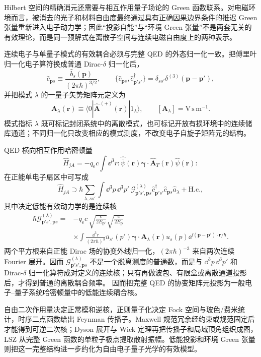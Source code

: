 Hilbert 空间的精确消元还需要与相互作用量子场论的 Green 函数联系。对电磁环境而言，被消去的光子和材料自由度最终通过具有正确因果边界条件的推迟 Green 张量重新进入电子动力学；因此“投影自能”与“环境 Green 张量”不是两套无关的有效理论，而是同一预解式在离散子空间与连续电磁自由度上的两种表示。



连续电子与单量子模式的有效耦合必须与完整 QED 的外态归一化一致。把傅里叶归一化电子算符换成普通 Dirac-$\delta$ 归一化后，
\[
 \hat c_{\mathbf p s}
 \equiv\frac{\hat b_s(\mathbf p)}{(2\pi\hbar)^{3/2}},
 \qquad
 \{\hat c_{\mathbf p s},\hat c_{\mathbf p's'}^\dagger\}
 =\delta_{ss'}\delta^{(3)}(\mathbf p-\mathbf p'),
\]
并把模式 $\lambda$ 的一量子矢势矩阵元定义为
\[
 \mathbf A_\lambda(\mathbf r)
 \equiv
 \langle0|\hat{\mathbf A}^{(+)}(\mathbf r)|1_\lambda\rangle,
 \qquad
 [\mathbf A_\lambda]=\mathrm{V\,s\,m^{-1}}.
\]
模式指标 $\lambda$ 既可标记封闭系统中的离散模式，也可标记开放有损环境中的连续储库通道；不同归一化只改变相应的模式测度，不改变电子自旋子矩阵元的结构。

QED 横向相互作用哈密顿量
\[
 \hat H_{jA}
 =-q_{\mathrm e} c\int\dd^3 r:\!\hat{\bar\psi}(\mathbf r)
 \boldsymbol\gamma\cdot\hat{\mathbf A}_T(\mathbf r)
 \hat\psi(\mathbf r)\!:
\]
在正能单电子扇区中可写成
\[
 \hat H_{jA}
 \supset
 \hbar\sum_{\lambda,ss'}\int\dd^3 p\,\dd^3 p'\,
 \mathcal G^{(\lambda)}_{\mathbf p's',\mathbf ps}
 \hat c_{\mathbf p's'}^\dagger\hat c_{\mathbf ps}\hat a_\lambda
 +\mathrm{H.c.},
\]
其中决定低能有效动力学的是连续核
\begin{equation}
 \boxed{
 \begin{aligned}
 \hbar\mathcal G^{(\lambda)}_{\mathbf p's',\mathbf ps}
 ={}&-q_{\mathrm e} c\,
 \sqrt{\frac{c}{2E_{\mathbf p'}}}
 \sqrt{\frac{c}{2E_{\mathbf p}}}\\
 &\times\int\frac{\dd^3 r}{(2\pi\hbar)^3}
 \bar u_{s'}(p')
 \boldsymbol\gamma\cdot\mathbf A_\lambda(\mathbf r)
 u_s(p)
 \ee^{\ii(\mathbf p-\mathbf p')\cdot\mathbf r/\hbar}.
 \end{aligned}}
 \label{eq:qed_to_mode_matrix_element_detailed}
\end{equation}
两个平方根来自正能 Dirac 场的协变外线归一化，$(2\pi\hbar)^{-3}$ 来自两次连续 Fourier 展开。因而 $\mathcal G^{(\lambda)}_{\mathbf p's',\mathbf ps}$ 不是一个脱离测度的普通数，而是与 $\dd^3 p\,\dd^3 p'$ 和 Dirac-$\delta$ 归一化算符成对定义的连续核；只有再做波包、有限盒或离散通道投影后，才得到普通的离散耦合频率。 因而把完整 QED 的协变矩阵元投影为一般电子--量子系统哈密顿量中的低能连续耦合核。

自由二次作用量决定正常模和逆核，正则量子化决定 Fock 空间与玻色/费米统计，时序二点函数给出 Feynman 传播子。Maxwell 规范冗余经约束或规范固定后才能得到可逆二次核；Dyson 展开与 Wick 定理再把传播子和局域顶角组织成图，LSZ 从完整 Green 函数的单粒子极点提取散射振幅。低能投影和环境 Green 张量则把这一完整结构进一步约化为自由电子量子光学的有效模型。




